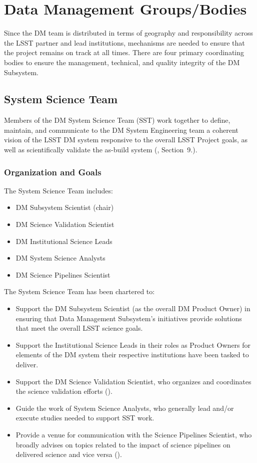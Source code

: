 \section{Data Management Groups/Bodies} \label{sect:groups}

Since the DM team is distributed in terms of geography and responsibility across the LSST partner and lead institutions, mechanisms are needed to ensure that the project remains on track at all times. There are four primary coordinating bodies to ensure the management, technical, and quality integrity of the DM Subsystem.

\subsection{System Science Team \label{sect:dmsst}}

Members of the DM System Science Team (SST) work together to define, maintain, and communicate to the DM System Engineering team a coherent vision of the LSST DM system responsive to the overall LSST Project goals, as well as scientifically validate the as-build system (, Section~9.).

\subsubsection{Organization and Goals}

The System Science Team includes:
\begin{itemize}
\item DM Subsystem Scientist (chair)
\item DM Science Validation Scientist
\item DM Institutional Science Leads
\item DM System Science Analysts
\item DM Science Pipelines Scientist
\end{itemize}

The System Science Team has been chartered to:
\begin{itemize}
\item Support the DM Subsystem Scientist (as the overall DM Product Owner) in ensuring that Data Management Subsystem's initiatives provide solutions that meet the overall LSST science goals.
\item Support the Institutional Science Leads in their roles as Product Owners for elements of the DM system their respective institutions have been tasked to deliver.
\item Support the DM Science Validation Scientist, who organizes and coordinates the science validation efforts ().
\item Guide the work of System Science Analysts, who generally lead and/or execute studies needed to support SST work.
\item Provide a venue for communication with the Science Pipelines Scientist, who broadly advises on topics related to the impact of science pipelines on delivered science and vice versa ().
\end{itemize}

